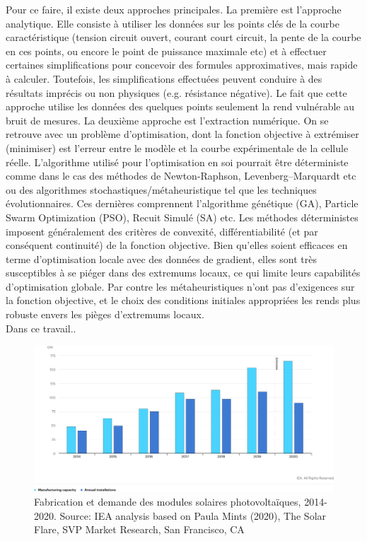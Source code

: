 Pour ce faire, il existe deux approches principales. La première est l'approche analytique. Elle consiste à utiliser les données sur les points clés de la courbe caractéristique (tension circuit ouvert, courant court circuit, la pente de la courbe en ces points, ou encore le point de puissance maximale etc) et à effectuer certaines simplifications pour concevoir des formules approximatives, mais rapide à calculer. Toutefois, les simplifications effectuées peuvent conduire à des résultats imprécis ou non physiques (e.g. résistance négative). Le fait que cette approche utilise les données des quelques points seulement la rend vulnérable au bruit de mesures. La deuxième approche est l'extraction numérique. On se retrouve avec un problème d'optimisation, dont la fonction objective à extrémiser (minimiser) est l'erreur entre le modèle et la courbe expérimentale de la cellule réelle. L'algorithme utilisé pour l'optimisation en soi pourrait être déterministe comme dans le cas des méthodes de Newton-Raphson, Levenberg–Marquardt etc ou des algorithmes stochastiques/métaheuristique tel que les techniques évolutionnaires. Ces dernières comprennent l'algorithme génétique (GA), Particle Swarm Optimization (PSO), Recuit Simulé (SA) etc. Les méthodes déterministes imposent généralement des critères de convexité, différentiabilité (et par conséquent continuité) de la fonction objective. Bien qu'elles soient efficaces en terme d'optimisation locale avec des données de gradient, elles sont très susceptibles à se piéger dans des extremums locaux, ce qui limite leurs capabilités d'optimisation globale. Par contre les métaheuristiques n'ont pas d'exigences sur la fonction objective, et le choix des conditions initiales appropriées les rends plus robuste envers les pièges d'extremums locaux.\\
Dans ce travail..
\begin{figure}
  \begin{center}
    \includegraphics[width=\textwidth]{resources/ieapv.png}
    \caption{Fabrication et demande des modules solaires photovoltaïques, 2014-2020. Source: IEA analysis based on Paula Mints (2020), The Solar Flare, SVP Market Research, San Francisco, CA \cite{iea2020}}
    \label{fig:ieapv}
  \end{center}
\end{figure}
